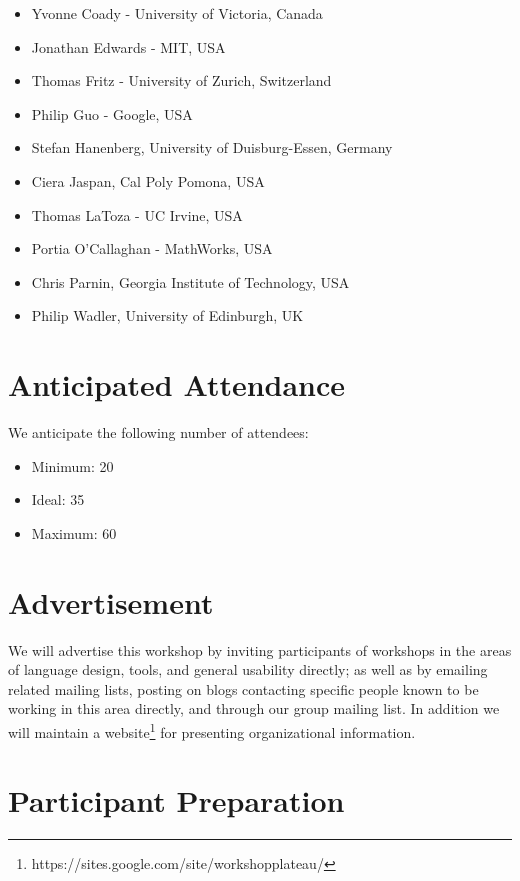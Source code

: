 \documentclass{sigplanconf}
\begin{document}
\begin{itemize}
\item Yvonne Coady - University of Victoria, Canada
\item Jonathan Edwards - MIT, USA
\item Thomas Fritz - University of Zurich, Switzerland
\item Philip Guo - Google, USA
\item Stefan Hanenberg, University of Duisburg-Essen, Germany
\item Ciera Jaspan, Cal Poly Pomona, USA
\item Thomas LaToza - UC Irvine, USA
\item Portia O'Callaghan - MathWorks, USA
\item Chris Parnin, Georgia Institute of Technology, USA
\item Philip Wadler, University of Edinburgh, UK
\end{itemize}


\section{Anticipated Attendance}

We anticipate the following number of attendees:

\begin{itemize}
\item Minimum: 20 
\item Ideal: 35
\item Maximum: 60 
\end{itemize}

\section{Advertisement}

We will advertise this workshop by inviting participants of workshops
in the areas of language design, tools, and general usability
directly; as well as by emailing related mailing lists, posting on
blogs contacting specific people known to be working in this area directly,
and through our group mailing list. In addition we will maintain a website\footnote{https://sites.google.com/site/workshopplateau/} for presenting organizational information.

\section{Participant Preparation}\label{preparation}
\end{document}
